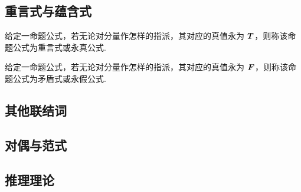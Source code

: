 \subsection{重言式与蕴含式}

\begin{definition}[重言式]
    给定一命题公式，若无论对分量作怎样的指派，其对应的真值永为 $\vb*{T}$，则称该命题公式为重言式或永真公式.
\end{definition}

\begin{definition}[矛盾式]
    给定一命题公式，若无论对分量作怎样的指派，其对应的真值永为 $\vb*{F}$，则称该命题公式为矛盾式或永假公式.
\end{definition}

\subsection{其他联结词}

\subsection{对偶与范式}

\subsection{推理理论}

